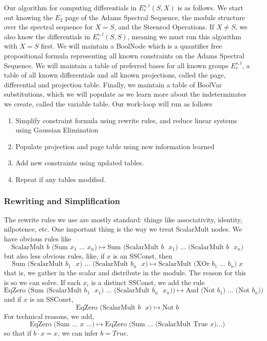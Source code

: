 Our algorithm for computing differentials in $E_r^{s,t}(S,X)$ is as follows.  
We start out knowing the $E_2$ page of the Adams Spectral Sequence, the module structure over the spectral sequence for $X=S$, and the Steenrod Operations.
If $X\ne S$, we also know the differentials in $E_r^{s,t}(S,S)$, meaning we must run this algorithm with $X=S$ first.  
We will maintain a BoolNode which is a quantifier free propositional formula representing all known constraints on the Adams Spectral Sequence.
We will maintain a table of preferred bases for all known groups $E_r^{s,t}$, a table of all known differentials and all known projections, called the page, differential and projection table.  
Finally, we maintain a table of BoolVar substitutions, which we will populate as we learn more about the indeterminates we create, called the variable table.
Our work-loop will run as follows
\begin{enumerate}
\item Simplify constraint formula using rewrite rules, and reduce linear systems using Gaussian Elimination
\item Populate projection and page table using new information learned
\item Add new constraints using updated tables.  
\item Repeat if any tables modified.  
\end{enumerate}

\subsubsection{Rewriting and Simplification}

The rewrite rules we use are mostly standard: things like associativity, identity, nilpotence, etc.
One important thing is the way we treat ScalarMult nodes.
We have obvious rules like
\[\mbox{ScalarMult $b$ (Sum $x_1$ ... $x_n$)}\mapsto 
\mbox{Sum (ScalarMult $b$ $x_1$) ... (ScalarMult $b$ $x_n$)}\]
but also less obvious rules, like, if $x$ is an SSConst, then
\[\mbox{Sum (ScalarMult $b_1$ $x$) ... (ScalarMult $b_n$ $x$)} \mapsto
\mbox{ScalarMult (XOr $b_1$ ... $b_n$) $x$}\]
that is, we gather in the scalar and distribute in the module.  
The reason for this is so we can solve.  
If each $x_i$ is a distinct SSConst, we add the rule
\[\mbox{EqZero (Sum (ScalarMult $b_1$ $x_1$) ... (ScalarMult $b_n$ $x_n$))}
\mapsto \mbox{And (Not $b_1$) ... (Not $b_n$))}\]
and if $x$ is an SSConst,
\[\mbox{EqZero (ScalarMult $b$ $x$)} \mapsto \mbox{Not $b$}\]
For technical reasons, we add, 
\[\mbox{EqZero (Sum ... $x$ ...)}\mapsto \mbox{EqZero (Sum ... (ScalarMult True $x$)...)}\]
so that if $b\cdot x=x$, we can infer $b=True$.  


